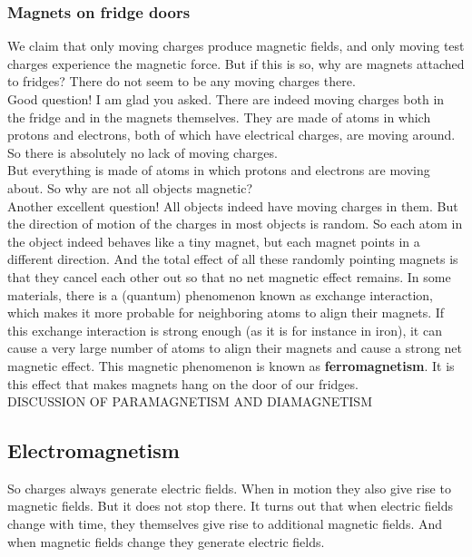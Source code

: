 \subsubsection{Magnets on fridge doors}

\noindent We claim that only moving charges produce magnetic fields, and only moving test charges experience the magnetic force. But if this is so, why are magnets attached to fridges? There do not seem to be any moving charges there.\\

\noindent Good question! I am glad you asked. There are indeed moving charges both in the fridge and in the magnets themselves. They are made of atoms in which protons and electrons, both of which have electrical charges, are moving around. So there is absolutely no lack of moving charges.\\

\noindent But everything is made of atoms in which protons and electrons are moving about. So why are not all objects magnetic?\\

\noindent Another excellent question! All objects indeed have moving charges in them. But the direction of motion of the charges in most objects is random. So each atom in the object indeed behaves like a tiny magnet, but each magnet points in a different direction. And the total effect of all these randomly pointing magnets is that they cancel each other out so that no net magnetic effect remains. In some materials, there is a (quantum) phenomenon known as exchange interaction, which makes it more probable for neighboring atoms to align their magnets.  If this exchange interaction is strong enough (as it is for instance in iron), it can cause a very large number of atoms to align their magnets and cause a strong net magnetic effect. This magnetic phenomenon is known as \textbf{ferromagnetism}. It is this effect that makes magnets hang on the door of our fridges.\\
DISCUSSION OF PARAMAGNETISM AND DIAMAGNETISM

\subsection{Electromagnetism}

\noindent So charges always generate electric fields. When in motion they also give rise to magnetic fields. But it does not stop there. It turns out that when electric fields change with time, they themselves give rise to additional magnetic fields. And when magnetic fields change they generate electric fields.\\

